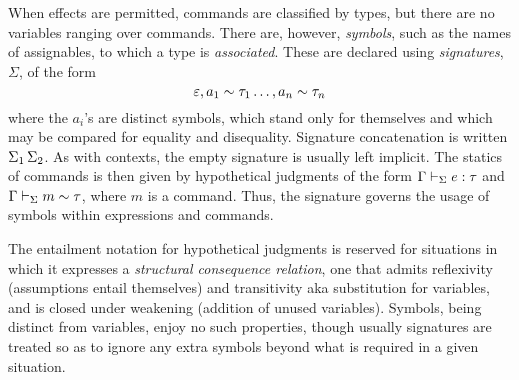 \documentclass[11pt]{article}
\begin{document}
When effects are permitted, commands are classified by types, but there are no variables ranging over commands.  There are, however, \emph{symbols}, such as the names of assignables, to which a type is \emph{associated}.  These are declared using \emph{signatures}, $\Sigma$, of the form
\[
    \extSig{\extSig{\empSig}{\hasTp{a_1}{\tau_1}}\dots}{\hasTp{a_n}{\tau_n}}
\]
where the $a_i$'s are distinct symbols, which stand only for themselves and which may be compared for equality and disequality.  Signature concatenation is written $\Sigma_1\,\Sigma_2$.  As with contexts, the empty signature is usually left implicit.  The statics of commands is then given by hypothetical judgments of the form $\Gamma\hypJdg[\Sigma] \isOf{e}{\tau}$ and $\Gamma\hypJdg[\Sigma] \hasTp{m}{\tau}$, where $m$ is a command.  Thus, the signature governs the usage of symbols within expressions and commands.

\smallskip

The entailment notation for hypothetical judgments is reserved for situations in which it expresses a \emph{structural consequence relation}, one that admits reflexivity (assumptions entail themselves) and transitivity aka substitution for variables, and is closed under weakening (addition of unused variables).  Symbols, being distinct from variables, enjoy no such properties, though usually signatures are treated so as to ignore any extra symbols beyond what is required in a given situation.
\end{document}
